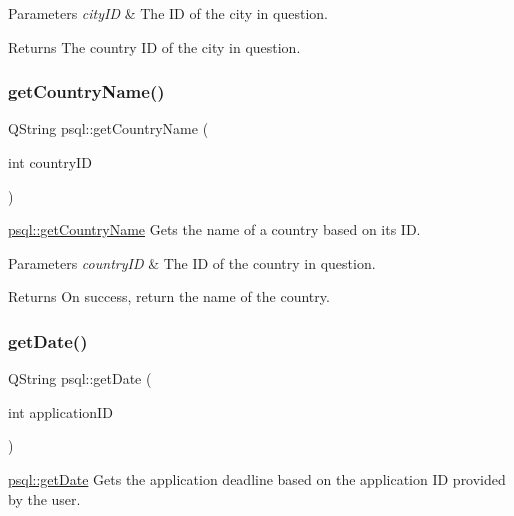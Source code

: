 \begin{DoxyParams}{Parameters}
{\em city\+ID} & The ID of the city in question. \\
\hline
\end{DoxyParams}
\begin{DoxyReturn}{Returns}
The country ID of the city in question. 
\end{DoxyReturn}
\mbox{\label{classpsql_a5724e9992e6a5c98524ab73b98f4202d}} 
\subsubsection{\texorpdfstring{get\+Country\+Name()}{getCountryName()}}
{\footnotesize\ttfamily Q\+String psql\+::get\+Country\+Name (\begin{DoxyParamCaption}\item[{int}]{country\+ID }\end{DoxyParamCaption})}



\mbox{\hyperlink{classpsql_a5724e9992e6a5c98524ab73b98f4202d}{psql\+::get\+Country\+Name}} Gets the name of a country based on its ID. 


\begin{DoxyParams}{Parameters}
{\em country\+ID} & The ID of the country in question. \\
\hline
\end{DoxyParams}
\begin{DoxyReturn}{Returns}
On success, return the name of the country. 
\end{DoxyReturn}
\mbox{\label{classpsql_a561f96bfe7e9d092077712dd6b186af8}} 
\subsubsection{\texorpdfstring{get\+Date()}{getDate()}}
{\footnotesize\ttfamily Q\+String psql\+::get\+Date (\begin{DoxyParamCaption}\item[{int}]{application\+ID }\end{DoxyParamCaption})}



\mbox{\hyperlink{classpsql_a561f96bfe7e9d092077712dd6b186af8}{psql\+::get\+Date}} Gets the application deadline based on the application ID provided by the user. 


